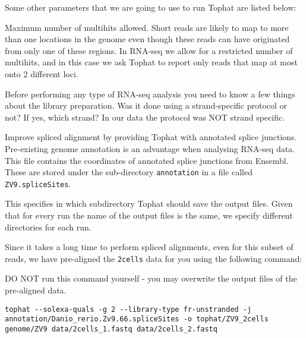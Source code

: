 \begin{note}
Some other parameters that we are going to use to run Tophat are listed below:
\begin{description}[style=multiline,labelindent=0cm,align=right,leftmargin=\descriptionlabelspace,rightmargin=1.5cm,font=\ttfamily]
 \item[-g] Maximum number of multihits allowed. Short reads are likely to map to
 more than one locations in the genome even though these reads can have originated
 from only one of these regions. In RNA-seq we allow for a restricted number of
 multihits, and in this case we ask Tophat to report only reads that map at most
 onto 2 different loci.
 \item[--library-type] Before performing any type of RNA-seq analysis you need
 to know a few things about the library preparation. Was it done using a
 strand-specific protocol or not? If yes, which strand? In our data the protocol
 was NOT strand specific.
 \item[-J] Improve spliced alignment by providing Tophat with annotated splice
 junctions. Pre-existing genome annotation is an advantage when analysing RNA-seq
 data. This file contains the coordinates of annotated splice junctions from Ensembl.
 These are stored under the sub-directory \texttt{annotation} in a file called
 \texttt{ZV9.spliceSites}.
 \item[-o] This specifies in which subdirectory Tophat should save the output
 files. Given that for every run the name of the output files is the same, we
 specify different directories for each run.
\end{description}
\end{note}

Since it takes a long time to perform spliced alignments, even for this subset of
reads, we have pre-aligned the \texttt{2cells} data for you using the following command:
\begin{warning}
  DO NOT run this command yourself - you may overwrite the output files of the
  pre-aligned data.
\end{warning}

\begin{lstlisting}
tophat --solexa-quals -g 2 --library-type fr-unstranded -j annotation/Danio_rerio.Zv9.66.spliceSites -o tophat/ZV9_2cells genome/ZV9 data/2cells_1.fastq data/2cells_2.fastq
\end{lstlisting}

